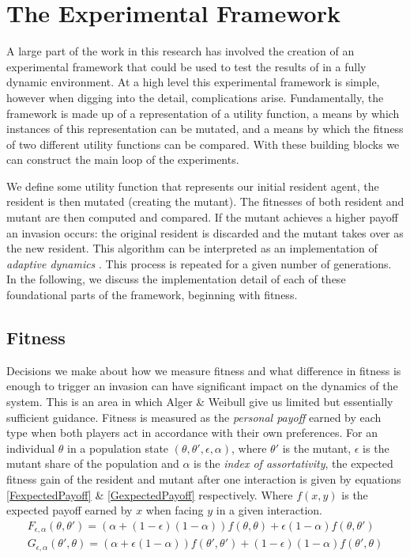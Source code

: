 \documentclass[11pt]{book}
\newcommand*{\np}{\par\noindent\newline}
\begin{document}
\chapter{The Experimental Framework}\label{experimentalFramework}
A large part of the work in this research has involved the creation of an experimental framework that could be used to test the results of \citet{alger_generalization_2012} in a fully dynamic environment.
At a high level this experimental framework is simple, however when digging into the detail, complications arise.
Fundamentally, the framework is made up of a representation of a utility function, 
a means by which instances of this representation can be mutated, and a means by which the fitness of two different utility functions can be compared.
With these building blocks we can construct the main loop of the experiments.

\np We define some utility function that represents our initial resident agent, the resident is then mutated (creating the mutant). 
The fitnesses of both resident and mutant are then computed and compared. 
If the mutant achieves a higher payoff an invasion occurs: the original resident is discarded and the mutant takes over as the new resident.
This algorithm can be interpreted as an implementation of \textit{adaptive dynamics} \citep{waxman_20_2005}.
This process is repeated for a given number of generations.
In the following, we discuss the implementation detail of each of these foundational parts of the framework, beginning with fitness.


\section{Fitness}
\np Decisions we make about how we measure fitness and what difference in fitness is enough to trigger an invasion can have significant impact on the dynamics of the system.
This is an area in which Alger \& Weibull give us limited but essentially sufficient guidance.
Fitness is measured as the \textit{personal payoff} earned by each type when both players act in accordance with their own preferences.
For an individual $\theta$ in a population state $(\theta, \theta', \epsilon,\alpha)$,
where $\theta'$ is the mutant, $\epsilon$ is the mutant share of the population and $\alpha$ is the \textit{index of assortativity}, the expected fitness gain of the resident and mutant after one interaction is given by equations \ref{FexpectedPayoff} \& \ref{GexpectedPayoff} respectively.
Where $f(x, y)$ is the expected payoff earned by $x$ when facing $y$ in a given interaction.
\newline
\begin{gather}
	\label{FexpectedPayoff}
	F_{\epsilon, \alpha}(\theta, \theta') = (\alpha +(1-\epsilon)(1-\alpha))f(\theta, \theta) + \epsilon(1-\alpha)f(\theta, \theta')\\
	\label{GexpectedPayoff}
	G_{\epsilon, \alpha}(\theta', \theta) = (\alpha +\epsilon(1-\alpha))f(\theta', \theta') + (1-\epsilon)(1-\alpha)f(\theta', \theta)
\end{gather}
\end{document}
